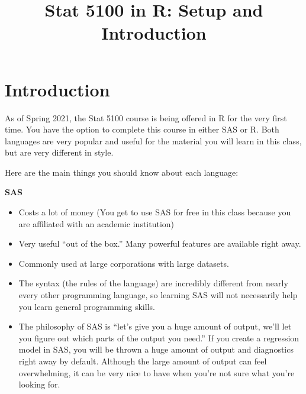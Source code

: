 \documentclass{article}\usepackage[]{graphicx}\usepackage[]{color}
\begin{document}
\title{%
  Stat 5100 in R: Setup and Introduction \\
}
\date{}

\maketitle

\tableofcontents

\section{Introduction}

As of Spring 2021, the Stat 5100 course is being offered in R for the very first time. You have the option to complete this course in either SAS or R. Both languages are very popular and useful for the material you will learn in this class, but are very different in style.

Here are the main things you should know about each language:

\bigskip

\textbf{SAS}
\begin{itemize}
  \item Costs a lot of money (You get to use SAS for free in this class because you are affiliated with an academic institution)
  \item Very useful ``out of the box.'' Many powerful features are available right away.
  \item Commonly used at large corporations with large datasets.
  \item The syntax (the rules of the language) are incredibly different from nearly every other programming language, so learning SAS will not necessarily help you learn general programming skills.
  \item The philosophy of SAS is ``let's give you a huge amount of output, we'll let you figure out which parts of the output you need.'' If you create a regression model in SAS, you will be thrown a huge amount of output and diagnostics right away by default. Although the large amount of output can feel overwhelming, it can be very nice to have when you're not sure what you're looking for.
\end{itemize}

\medskip
\end{document}

